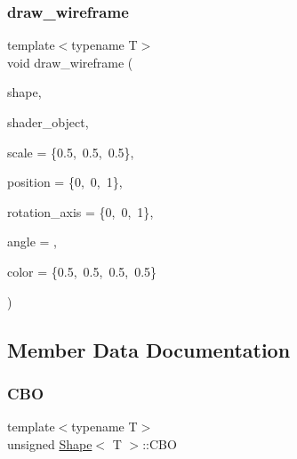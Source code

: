 \mbox{\label{classShape_ad57e4dd441b60269c43114f31ffa6085}} 
\subsubsection{\texorpdfstring{draw\+\_\+wireframe}{draw\_wireframe}}
{\footnotesize\ttfamily template$<$typename T$>$ \\
void draw\+\_\+wireframe (\begin{DoxyParamCaption}\item[{\mbox{\hyperlink{classShape}{Shape}}$<$ T $>$ \&}]{shape,  }\item[{\mbox{\hyperlink{classShader}{Shader}}$<$ \mbox{\hyperlink{render_8hpp_a24e288e18eb7b6e01de7565001fedb60aa98862073f71a928bad5099cc3e1c2ed}{R\+E\+N\+D\+E\+R\+\_\+\+T\+Y\+P\+E\+::\+U\+N\+I\+F\+O\+R\+M\+\_\+\+C\+O\+L\+OR}} $>$ \&}]{shader\+\_\+object,  }\item[{std\+::array$<$ float, 3 $>$}]{scale = {\ttfamily \{0.5,~0.5,~0.5\}},  }\item[{std\+::array$<$ float, 3 $>$}]{position = {\ttfamily \{0,~0,~1\}},  }\item[{std\+::array$<$ float, 3 $>$}]{rotation\+\_\+axis = {\ttfamily \{0,~0,~1\}},  }\item[{float}]{angle = {},  }\item[{glm\+::vec4}]{color = {\ttfamily \{0.5,~0.5,~0.5,~0.5\}} }\end{DoxyParamCaption})\hspace{0.3cm}{\ttfamily [friend]}}



\subsection{Member Data Documentation}
\mbox{\label{classShape_a66502f6f87b46a705d131dc7b0b67d42}} 
\subsubsection{\texorpdfstring{C\+BO}{CBO}}
{\footnotesize\ttfamily template$<$typename T$>$ \\
unsigned \mbox{\hyperlink{classShape}{Shape}}$<$ T $>$\+::C\+BO\hspace{0.3cm}{\ttfamily [protected]}}

